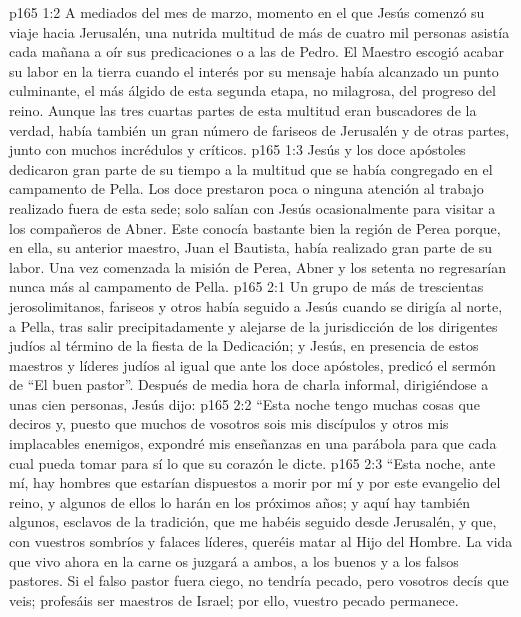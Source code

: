\vs p165 1:2 A mediados del mes de marzo, momento en el que Jesús comenzó su viaje hacia Jerusalén, una nutrida multitud de más de cuatro mil personas asistía cada mañana a oír sus predicaciones o a las de Pedro. El Maestro escogió acabar su labor en la tierra cuando el interés por su mensaje había alcanzado un punto culminante, el más álgido de esta segunda etapa, no milagrosa, del progreso del reino. Aunque las tres cuartas partes de esta multitud eran buscadores de la verdad, había también un gran número de fariseos de Jerusalén y de otras partes, junto con muchos incrédulos y críticos.
\vs p165 1:3 Jesús y los doce apóstoles dedicaron gran parte de su tiempo a la multitud que se había congregado en el campamento de Pella. Los doce prestaron poca o ninguna atención al trabajo realizado fuera de esta sede; solo salían con Jesús ocasionalmente para visitar a los compañeros de Abner. Este conocía bastante bien la región de Perea porque, en ella, su anterior maestro, Juan el Bautista, había realizado gran parte de su labor. Una vez comenzada la misión de Perea, Abner y los setenta no regresarían nunca más al campamento de Pella.
\vs p165 2:1 Un grupo de más de trescientas jerosolimitanos, fariseos y otros había seguido a Jesús cuando se dirigía al norte, a Pella, tras salir precipitadamente y alejarse de la jurisdicción de los dirigentes judíos al término de la fiesta de la Dedicación; y Jesús, en presencia de estos maestros y líderes judíos al igual que ante los doce apóstoles, predicó el sermón de “El buen pastor”. Después de media hora de charla informal, dirigiéndose a unas cien personas, Jesús dijo:
\vs p165 2:2 \pc “Esta noche tengo muchas cosas que deciros y, puesto que muchos de vosotros sois mis discípulos y otros mis implacables enemigos, expondré mis enseñanzas en una parábola para que cada cual pueda tomar para sí lo que su corazón le dicte.
\vs p165 2:3 “Esta noche, ante mí, hay hombres que estarían dispuestos a morir por mí y por este evangelio del reino, y algunos de ellos lo harán en los próximos años; y aquí hay también algunos, esclavos de la tradición, que me habéis seguido desde Jerusalén, y que, con vuestros sombríos y falaces líderes, queréis matar al Hijo del Hombre. La vida que vivo ahora en la carne os juzgará a ambos, a los buenos y a los falsos pastores. Si el falso pastor fuera ciego, no tendría pecado, pero vosotros decís que veis; profesáis ser maestros de Israel; por ello, vuestro pecado permanece.
